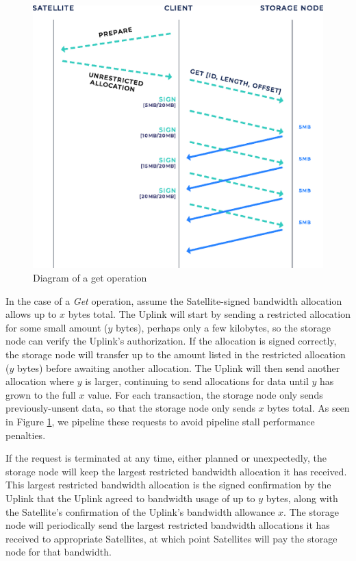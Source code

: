\documentclass[8pt,fleqn,openany]{book}
\begin{document}
\begin{figure}[!htbp]
\centering
\includegraphics[height=.4\textheight]{images/get.eps}
\caption{Diagram of a get operation}
\label{fig:bap-get}
\end{figure}

In the case of a {\em Get} operation, assume the Satellite-signed bandwidth
allocation allows up to $x$ bytes total. The Uplink
will start by sending a restricted allocation for some small amount ($y$ bytes),
perhaps only a few kilobytes,
so the storage node can verify the Uplink's authorization.
If the allocation is signed correctly, the storage node will
transfer up to the amount listed in the restricted allocation ($y$ bytes) before
awaiting another allocation. The Uplink will then send another allocation where
$y$ is larger, continuing to send allocations for data until $y$ has grown to
the full $x$ value.
For each transaction, the storage node only sends previously-unsent data,
so that the storage node only sends $x$ bytes total.
As seen in Figure \ref{fig:bap-get},
we pipeline these requests to avoid pipeline stall performance penalties.

If the request is terminated at any time,
either planned or unexpectedly,
the storage node will keep the largest restricted bandwidth allocation it has
received.
This largest restricted bandwidth allocation is the signed confirmation
by the Uplink that the Uplink agreed to bandwidth usage of up to $y$
bytes, along with the Satellite's confirmation of the Uplink's bandwidth
allowance $x$.
The storage node will periodically send the largest restricted bandwidth
allocations it has received to appropriate Satellites, at which point
Satellites will pay the storage node for that bandwidth.
\end{document}
